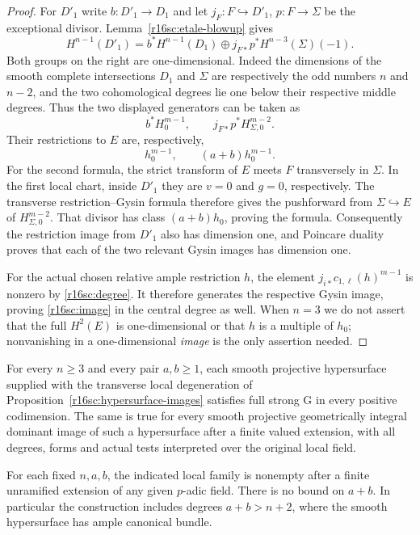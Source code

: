 \begin{proof}
For $D'_1$ write $b:D'_1\to D_1$ and let
$j_F:F\hookrightarrow D'_1$, $p:F\to\Sigma$ be the
exceptional divisor. Lemma~\ref{r16sc:etale-blowup} gives
\[
 H^{n-1}(D'_1)
    =b^*H^{n-1}(D_1)
            \oplus j_{F*}p^*H^{n-3}(\Sigma)(-1).
 \tag{SC16.12}\label{r16sc:central-blowup}
\]
Both groups on the right are one-dimensional. Indeed the
dimensions of the smooth complete intersections $D_1$
and $\Sigma$ are respectively the odd numbers $n$ and
$n-2$, and the two cohomological degrees lie one below
their respective middle degrees. Thus the two displayed
generators can be taken as
\[
                b^*H_0^{m-1},\qquad
                j_{F*}p^*H_{\Sigma,0}^{m-2}.
\]
Their restrictions to $E$ are, respectively,
\[
                     h_0^{m-1},\qquad
                     (a+b)h_0^{m-1}.
 \tag{SC16.13}\label{r16sc:central-restrictions}
\]
For the second formula, the strict transform of $E$ meets
$F$ transversely in $\Sigma$. In the first local chart,
inside $D'_1$ they are $v=0$ and $g=0$, respectively.
The transverse restriction--Gysin formula therefore gives
the pushforward from $\Sigma\hookrightarrow E$ of
$H_{\Sigma,0}^{m-2}$. That divisor has class
$(a+b)h_0$, proving the formula.
Consequently the restriction image from $D'_1$ also has
dimension one, and Poincare duality proves that each of
the two relevant Gysin images has dimension one.

For the actual chosen relative ample restriction $h$, the
element $j_{i*}c_{1,\ell}(h)^{m-1}$ is nonzero by
\eqref{r16sc:degree}. It therefore generates the respective
Gysin image, proving \eqref{r16sc:image} in the central
degree as well. When $n=3$ we do not assert that the full
$H^2(E)$ is one-dimensional or that $h$ is a multiple of
$h_0$; nonvanishing in a one-dimensional \emph{image}
is the only assertion needed.
\end{proof}

\begin{theorem}
\label{r16sc:full-G}
For every $n\geq3$ and every pair $a,b\geq1$, each smooth
projective hypersurface supplied with the transverse local
degeneration of Proposition~\ref{r16sc:hypersurface-images}
satisfies full strong G in every positive codimension.
The same is true for every smooth projective geometrically
integral dominant image of such a hypersurface after a finite
valued extension, with all degrees, forms and actual tests
interpreted over the original local field.

For each fixed $n,a,b$, the indicated local family is nonempty
after a finite unramified extension of any given $p$-adic
field. There is no bound on $a+b$. In particular the construction
includes degrees $a+b>n+2$, where the smooth hypersurface has
ample canonical bundle.
\end{theorem}

